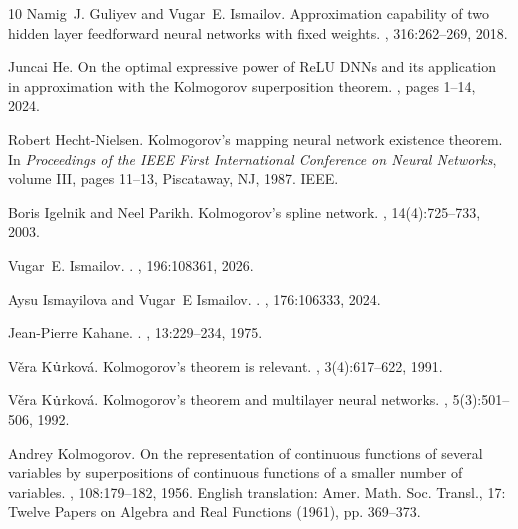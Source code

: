 \documentclass[10pt,reqno,final]{amsart}
\theoremstyle{remark}
\theoremstyle{definition}
\begin{document}
\begin{thebibliography}{10}
Namig~J. Guliyev and Vugar~E. Ismailov.
\newblock Approximation capability of two hidden layer feedforward neural
  networks with fixed weights.
, 316:262--269, 2018.

Juncai He.
\newblock On the optimal expressive power of {ReLU DNNs} and its application in
  approximation with the {Kolmogorov} superposition theorem.
,
  pages 1--14, 2024.

Robert Hecht-Nielsen.
\newblock Kolmogorov's mapping neural network existence theorem.
\newblock In {\em Proceedings of the IEEE First International Conference on
  Neural Networks}, volume III, pages 11--13, Piscataway, NJ, 1987. IEEE.

Boris Igelnik and Neel Parikh.
\newblock Kolmogorov's spline network.
, 14(4):725--733, 2003.

Vugar~E. Ismailov.
.
, 196:108361, 2026.

Aysu Ismayilova and Vugar~E Ismailov.
.
, 176:106333, 2024.

Jean-Pierre Kahane.
.
, 13:229--234, 1975.

V{\v{e}}ra K{$\dot {\rm u}$}rkov{\'a}.
\newblock Kolmogorov's theorem is relevant.
, 3(4):617--622, 1991.

V{\v{e}}ra K{$\dot {\rm u}$}rkov{\'a}.
\newblock Kolmogorov's theorem and multilayer neural networks.
, 5(3):501--506, 1992.

Andrey Kolmogorov.
\newblock On the representation of continuous functions of several variables by
  superpositions of continuous functions of a smaller number of variables.
, 108:179--182,
  1956.
\newblock English translation: Amer. Math. Soc. Transl., 17: Twelve Papers on
  Algebra and Real Functions (1961), pp. 369--373.


\end{thebibliography}
\end{document}
